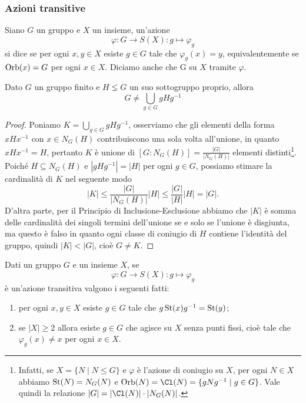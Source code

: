 \documentclass[11pt]{scrartcl}
\begin{document}
\subsubsection{Azioni transitive}

\begin{definition}
    Siano $G$ un gruppo e $X$ un insieme, un'azione \[
        \varphi:G\longrightarrow S(X) :g \longmapsto \varphi_g
    \]si dice  se per ogni $x, y \in X$ esiste $g \in G$
    tale che $\varphi_g(x) = y$, equivalentemente se $\operatorname{Orb}(x) = G$ per ogni 
    $x \in X$. Diciamo anche che G  su $X$ 
    tramite $\varphi$.
\end{definition}

\begin{lemma}
    \label{lemma2.0}
    Dato $G$ un gruppo finito e $H \lneq G$ un suo sottogruppo proprio, allora \[
        G \neq \bigcup_{g \in G}gHg^{-1}
    \]
\end{lemma}

\begin{proof}
    Poniamo $K = \displaystyle\bigcup_{g \in G}gHg^{-1}$, osserviamo che gli
    elementi della forma $xHx^{-1}$ con $x \in N_G(H)$ contribuiscono una
    sola volta all'unione, in quanto $xHx^{-1} = H$, pertanto $K$
    è unione di $[G:N_G(H)] = \displaystyle\frac{|G|}{|N_G(H)|}$ elementi distinti\footnote
    {Infatti, se $X = \{N\mid N\leqslant G\}$ e $\varphi$ è l'azione di coniugio
    su $X$, per ogni $N \in X$ abbiamo $\operatorname{St}(N) = N_G(N)$ e $\Orb(N) = \Cl(N) =
    \{gNg^{-1}\mid g \in G\}$. Vale quindi la relazione $|G| = |\Cl(N)|\cdot|N_G(N)|$.}. Poiché
    $H \subseteq N_G(H)$ e $|gHg^{-1}| = |H|$ per ogni $g \in G$, possiamo stimare 
    la cardinalità di $K$ nel seguente modo 
    \[
        |K| \leq\frac{|G|}{|N_G(H)|}|H| \leq\frac{|G|}{|H|}|H| = |G|.
    \]D'altra parte, per il Principio di Inclusione-Esclusione abbiamo che $|K|$ 
    è somma delle cardinalità dei singoli termini dell'unione se e solo se 
    l'unione è disgiunta, ma questo è falso in quanto ogni classe di coniugio
    di $H$ contiene l'identità del gruppo, quindi $|K| < |G|$, cioè $G \neq K$.
\end{proof}

\begin{proposition}
    \label{prop1.0}
    Dati un gruppo $G$ e un insieme $X$, se 
    \[
        \varphi:G\longrightarrow S(X) :g\longmapsto \varphi_g
    \]è un'azione transitiva valgono i seguenti fatti:
    \begin{enumerate}[(1)]
        \item per ogni $x, y \in X$ esiste $g \in G$ tale che $g\operatorname{St}(x)g^{-1} = \operatorname{St}(y)$;
        \item se $|X|\geqslant 2$ allora esiste $g \in G$ che agisce su $X$ senza
        punti fissi, cioè tale che $\varphi_g(x) \neq x$ per ogni $x \in X$.
    \end{enumerate}
\end{proposition}
\end{document}
